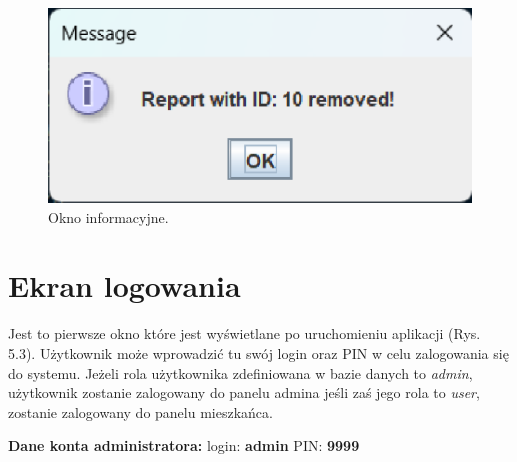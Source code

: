 \begin{figure}[H]
    \centering
    \includegraphics[width=\textwidth,height=0.2\textheight,keepaspectratio]{figures/app-images/info.eps}
    \caption{Okno informacyjne. \label{fig7}}
\end{figure}

\newpage
\section{Ekran logowania}

Jest to pierwsze okno które jest wyświetlane po uruchomieniu aplikacji (Rys. 5.3). Użytkownik może wprowadzić tu swój login oraz PIN w celu
zalogowania się do systemu. Jeżeli rola użytkownika zdefiniowana w bazie danych to \textit{admin}, użytkownik 
zostanie zalogowany do panelu admina jeśli zaś jego rola to \textit{user}, zostanie zalogowany do panelu mieszkańca. \newline

\noindent \textbf{Dane konta administratora:}
\newline login: \textbf{admin}
\newline PIN: \textbf{9999}

